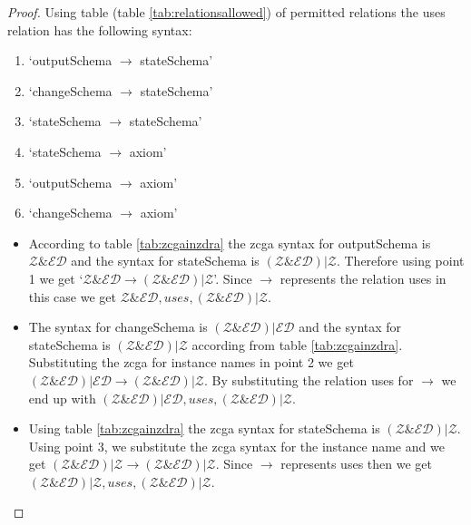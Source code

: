 \begin{proof}
Using table (table \ref{tab:relationsallowed}) of permitted relations the uses
relation has the following syntax:
\begin{enumerate}
\item `outputSchema $\longrightarrow$ stateSchema'
\item `changeSchema $\longrightarrow$ stateSchema'
\item `stateSchema $\longrightarrow$ stateSchema'
\item `stateSchema $\longrightarrow$ axiom'
\item `outputSchema $\longrightarrow$ axiom'
\item `changeSchema $\longrightarrow$ axiom'
\end{enumerate} 

\begin{itemize}
\item According to table \ref{tab:zcgainzdra} the \gls{zcga} syntax for
outputSchema is $\mathcal{Z}\&\mathcal{ED}$ and the syntax for stateSchema is
$(\mathcal{Z} \& \mathcal{ED}) | \mathcal{Z}$. Therefore using point 1 we get
`$\mathcal{Z}\&\mathcal{ED} \longrightarrow (\mathcal{Z} \& \mathcal{ED}) |
\mathcal{Z}$'. Since $\longrightarrow$ represents the relation uses in this case
we get $\mathcal{Z} \& \mathcal{ED}, uses, (\mathcal{Z} \& \mathcal{ED}) |
\mathcal{Z}$.

\item The syntax for changeSchema is $(\mathcal{Z} \& \mathcal{ED}) |
\mathcal{ED}$ and the syntax for stateSchema is $(\mathcal{Z} \& \mathcal{ED}) |
\mathcal{Z}$ according from table \ref{tab:zcgainzdra}. Substituting the
\gls{zcga} for instance names in point 2 we get $(\mathcal{Z} \& \mathcal{ED}) |
\mathcal{ED} \longrightarrow (\mathcal{Z} \& \mathcal{ED}) | \mathcal{Z}$. By
substituting the relation uses for $\longrightarrow$ we end up with
$(\mathcal{Z} \& \mathcal{ED}) | \mathcal{ED}, uses, (\mathcal{Z} \&
\mathcal{ED}) | \mathcal{Z}$.

\item Using table \ref{tab:zcgainzdra} the \gls{zcga} syntax for stateSchema is
$(\mathcal{Z} \& \mathcal{ED}) | \mathcal{Z}$. Using point 3, we substitute the
\gls{zcga} syntax for the instance name and we get $(\mathcal{Z} \&
\mathcal{ED}) | \mathcal{Z} \longrightarrow (\mathcal{Z} \& \mathcal{ED}) |
\mathcal{Z}$. Since $\longrightarrow$ represents uses then we get $(\mathcal{Z}
\& \mathcal{ED}) | \mathcal{Z}, uses, (\mathcal{Z} \& \mathcal{ED}) |
\mathcal{Z}$.


\end{itemize}
\end{proof}
